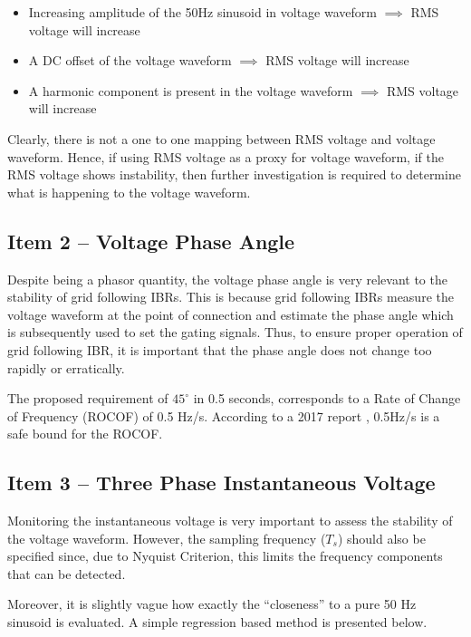 \documentclass[11pt,a4paper,]{article}
\providecommand{\tightlist}{%
  \setlength{\itemsep}{0pt}\setlength{\parskip}{0pt}}
\begin{document}
\begin{itemize}
\tightlist
\item
  Increasing amplitude of the 50Hz sinusoid in voltage waveform \(\implies\) RMS voltage will increase
\item
  A DC offset of the voltage waveform \(\implies\) RMS voltage will increase
\item
  A harmonic component is present in the voltage waveform \(\implies\) RMS voltage will increase
\end{itemize}

Clearly, there is not a one to one mapping between RMS voltage and voltage waveform. Hence, if using RMS voltage as a proxy for voltage waveform, if the RMS voltage shows instability, then further investigation is required to determine what is happening to the voltage waveform.

\subsection{Item 2 -- Voltage Phase Angle}

Despite being a phasor quantity, the voltage phase angle is very relevant to the stability of grid following IBRs. This is because grid following IBRs measure the voltage waveform at the point of connection and estimate the phase angle which is subsequently used to set the gating signals. Thus, to ensure proper operation of grid following IBR, it is important that the phase angle does not change too rapidly or erratically.

The proposed requirement of \(45^\circ\) in 0.5 seconds, corresponds to a Rate of Change of Frequency (ROCOF) of 0.5 Hz/s. According to a 2017 report \cite{ge2017advisory}, 0.5Hz/s is a safe bound for the ROCOF.

\subsection{Item 3 -- Three Phase Instantaneous Voltage}

Monitoring the instantaneous voltage is very important to assess the stability of the voltage waveform. However, the sampling frequency (\(T_s\)) should also be specified since, due to Nyquist Criterion, this limits the frequency components that can be detected.

Moreover, it is slightly vague how exactly the ``closeness'' to a pure 50 Hz sinusoid is evaluated. A simple regression based method is presented below.
\end{document}
